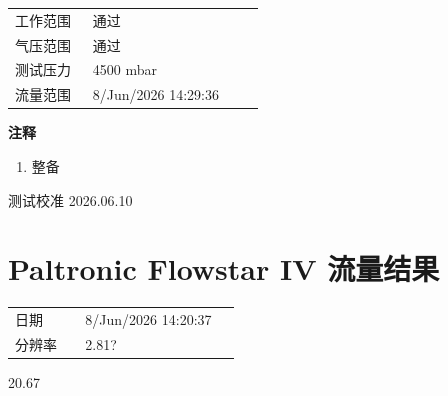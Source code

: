 \documentclass[UTF8,10pt,a4paper,fontset=fandol]{ctexart}
\newcommand{\fieldvalue}[1]{#1}
\newcommand{\handwritten}[1]{#1}
\begin{document}
\vspace{1em}

\begin{tabular}{@{}p{0.28\linewidth}p{0.62\linewidth}@{}}
工作范围 &
\fieldvalue{通过}
\\
气压范围 &
\fieldvalue{通过}
\\
测试压力 &
\fieldvalue{4500 mbar}
\\
流量范围 &
\fieldvalue{8/Jun/2026 14:29:36}
\\
\end{tabular}

\vspace{1em}

\textbf{注释}

\begin{enumerate}
\item 整备
\end{enumerate}

\handwritten{测试校准 2026.06.10}

\vfill

\section{Paltronic Flowstar IV 流量结果}

\begin{tabular}{@{}p{0.28\linewidth}p{0.62\linewidth}@{}}
日期 &
\fieldvalue{8/Jun/2026 14:20:37}
\\
分辨率 &
\fieldvalue{2.81?}
\\
\end{tabular}

\vspace{1em}

\begin{center}
\end{center}

\handwritten{20.67}
\end{document}
